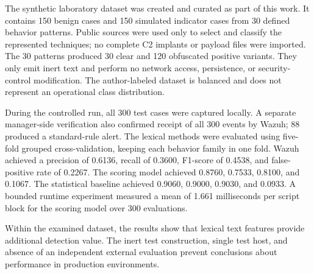 \documentclass[12pt,a4paper,oneside,parskip=half]{scrreprt}
\begin{document}
The synthetic laboratory dataset was created and curated as part of this work. It contains 150 benign cases and 150 simulated indicator cases from 30 defined behavior patterns. Public sources were used only to select and classify the represented techniques; no complete C2 implants or payload files were imported. The 30 patterns produced 30 clear and 120 obfuscated positive variants. They only emit inert text and perform no network access, persistence, or security-control modification. The author-labeled dataset is balanced and does not represent an operational class distribution.

During the controlled run, all 300 test cases were captured locally. A separate manager-side verification also confirmed receipt of all 300 events by Wazuh; 88 produced a standard-rule alert. The lexical methods were evaluated using five-fold grouped cross-validation, keeping each behavior family in one fold. Wazuh achieved a precision of 0.6136, recall of 0.3600, F1-score of 0.4538, and false-positive rate of 0.2267. The scoring model achieved 0.8760, 0.7533, 0.8100, and 0.1067. The statistical baseline achieved 0.9060, 0.9000, 0.9030, and 0.0933. A bounded runtime experiment measured a mean of 1.661 milliseconds per script block for the scoring model over 300 evaluations.

Within the examined dataset, the results show that lexical text features provide additional detection value. The inert test construction, single test host, and absence of an independent external evaluation prevent conclusions about performance in production environments.
\clearpage

{\singlespacing
\setlength{\parskip}{0pt}
\tableofcontents
}
\clearpage
{}
{}
\listoffigures
\clearpage
{}
{}
\listoftables
\clearpage
{}
{}
\lstlistoflistings
\clearpage
\end{document}
